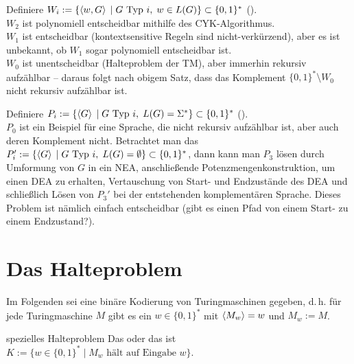 \begin{Bsp}
    Definiere $W_i := \{\left\langle w, G\right\rangle \;|\; G \text{ Typ } i,\; w \in L(G)\} \subset \{0, 1\}^\ast$
    ().\\
    $W_2$ ist polynomiell entscheidbar mithilfe des CYK-Algorithmus.\\
    $W_1$ ist entscheidbar (kontextsensitive Regeln sind nicht-verkürzend),
    aber es ist unbekannt, ob $W_1$ sogar polynomiell entscheidbar ist.\\
    $W_0$ ist unentscheidbar (Halteproblem der TM), aber immerhin rekursiv aufzählbar --
    daraus folgt nach obigem Satz, dass das Komplement $\{0, 1\}^\ast \setminus W_0$ nicht
    rekursiv aufzählbar ist.
\end{Bsp}

\begin{Bsp}
    Definiere $P_i := \{\left\langle G\right\rangle \;|\; G \text{ Typ } i,\; L(G) = \Sigma^\ast\} \subset
    \{0, 1\}^\ast$ ().\\
    $P_0$ ist ein Beispiel für eine Sprache, die nicht rekursiv aufzählbar ist,
    aber auch deren Komplement nicht.
    Betrachtet man das 
    $P_i' := \{\left\langle G\right\rangle \;|\; G \text{ Typ } i,\; L(G) = \emptyset\} \subset \{0, 1\}^\ast$,
    dann kann man $P_3$ lösen durch Umformung von $G$ in ein NEA, anschließende
    Potenzmengenkonstruktion, um einen DEA zu erhalten, Vertauschung von Start- und Endzustände
    des DEA und schließlich Lösen von $P_3'$ bei der entstehenden komplementären Sprache.
    Dieses Problem ist nämlich einfach entscheidbar (gibt es einen Pfad von einem Start- zu einem
    Endzustand?).
\end{Bsp}

\pagebreak

\section{%
    Das Halteproblem%
}

\begin{Bem}
    Im Folgenden sei eine binäre Kodierung von Turingmaschinen gegeben, d.\,h.
    für jede Turingmaschine $M$ gibt es ein $w \in \{0, 1\}^\ast$
    mit $\left\langle M_w\right\rangle = w$ und $M_w := M$.
\end{Bem}

\linie

\begin{Def}{spezielles Halteproblem}
    Das  oder das  ist
    $K := \{w \in \{0, 1\}^\ast \;|\; M_w \text{ hält auf Eingabe } w\}$.
\end{Def}

